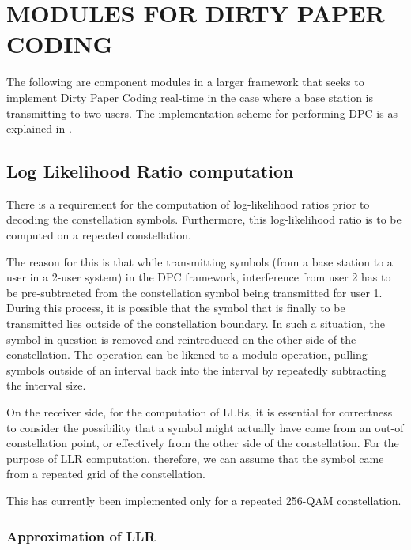 \chapter{MODULES FOR DIRTY PAPER CODING}
\label{chap:dpc-modules}

The following are component modules in a larger framework that seeks to
implement Dirty Paper Coding \citep{Costa1983} real-time in the
case where a base station is transmitting to two users. The implementation
scheme for performing DPC is as explained in
\cite{ShilpaThangarajBhashyam2010}.


\section{Log Likelihood Ratio computation}

There is a requirement for the computation of log-likelihood ratios prior to
decoding the constellation symbols. Furthermore, this log-likelihood ratio is
to be computed on a repeated constellation.

The reason for this is that while transmitting symbols (from a base station to
a user in a 2-user system) in the DPC framework, interference from user 2 has
to be pre-subtracted from the constellation symbol being transmitted for user
1. During this process, it is possible that the symbol that is finally to be
transmitted lies outside of the constellation boundary. In such a situation,
the symbol in question is removed and reintroduced on the other side of the
constellation. The operation can be likened to a modulo operation, pulling
symbols outside of an interval back into the interval by repeatedly subtracting
the interval size.

On the receiver side, for the computation of LLRs, it is essential for
correctness to consider the possibility that a symbol might actually have come
from an out-of constellation point, or effectively from the other side of the
constellation. For the purpose of LLR computation, therefore, we can assume
that the symbol came from a repeated grid of the constellation.

This has currently been implemented only for a repeated 256-QAM constellation.

\subsection{Approximation of LLR}

